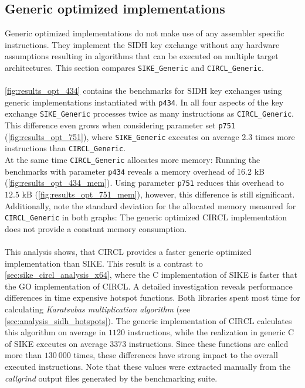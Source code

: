 \subsection{Generic optimized implementations}\label{sec:sike_circl_analysis_generic}
Generic optimized implementations do not make use of any assembler specific instructions. They implement the \gls{SIDH} key exchange without any hardware assumptions resulting in  algorithms that can be executed on multiple target architectures. This section compares \texttt{SIKE\_Generic} and \texttt{CIRCL\_Generic}.
\\\\
\autoref{fig:results_opt_434} contains the benchmarks for \gls{SIDH} key exchanges using generic implementations instantiated with \texttt{p434}.  In all four aspects of the key exchange \texttt{SIKE\_Generic} processes twice as many instructions as \texttt{CIRCL\_Generic}. This difference even grows when considering parameter set \texttt{p751} (\autoref{fig:results_opt_751}), where \texttt{SIKE\_Generic} executes on average 2.3 times more instructions than \texttt{CIRCL\_Generic}.\\
At the same time \texttt{CIRCL\_Generic} allocates more memory: Running the benchmarks with parameter \texttt{p434} reveals a memory overhead of $16.2$ \gls{kB} (\autoref{fig:results_opt_434_mem}). Using parameter \texttt{p751} reduces this overhead to $12.5$ \gls{kB} (\autoref{fig:results_opt_751_mem}), however, this difference is still significant. Additionally, note the standard deviation for the allocated memory measured for \texttt{CIRCL\_Generic} in both graphs: The generic optimized \gls{CIRCL} implementation does not provide a constant memory consumption.
\\\\
This analysis shows, that \gls{CIRCL} provides a faster generic optimized implementation than \gls{SIKE}. This result is a contrast to \autoref{sec:sike_circl_analysis_x64}, where the C implementation of \gls{SIKE} is faster that the GO implementation of \gls{CIRCL}. A detailed investigation reveals performance differences in time expensive hotspot functions. Both libraries spent most time for calculating \textit{Karatsubas multiplication algorithm} (see \autoref{sec:analysis_sidh_hotspots}). The generic implementation of \gls{CIRCL} calculates this algorithm on average in $1120$ instructions, while the realization in generic C of \gls{SIKE} executes on average $3373$ instructions. Since these functions are called more than $130\:000$ times, these differences have strong impact to the overall executed instructions. Note that these values were extracted manually from the \textit{callgrind} output files generated by the benchmarking suite.

